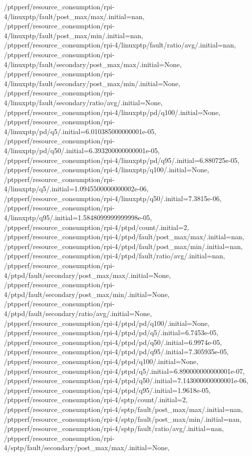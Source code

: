 {    /ptpperf/resource_consumption/rpi-4/linuxptp/fault/post_max/max/.initial=nan,
    /ptpperf/resource_consumption/rpi-4/linuxptp/fault/post_max/min/.initial=nan,
    /ptpperf/resource_consumption/rpi-4/linuxptp/fault/ratio/avg/.initial=nan,
    /ptpperf/resource_consumption/rpi-4/linuxptp/fault/secondary/post_max/max/.initial=None,
    /ptpperf/resource_consumption/rpi-4/linuxptp/fault/secondary/post_max/min/.initial=None,
    /ptpperf/resource_consumption/rpi-4/linuxptp/fault/secondary/ratio/avg/.initial=None,
    /ptpperf/resource_consumption/rpi-4/linuxptp/pd/q100/.initial=None,
    /ptpperf/resource_consumption/rpi-4/linuxptp/pd/q5/.initial=6.010385000000001e-05,
    /ptpperf/resource_consumption/rpi-4/linuxptp/pd/q50/.initial=6.393200000000001e-05,
    /ptpperf/resource_consumption/rpi-4/linuxptp/pd/q95/.initial=6.880725e-05,
    /ptpperf/resource_consumption/rpi-4/linuxptp/q100/.initial=None,
    /ptpperf/resource_consumption/rpi-4/linuxptp/q5/.initial=1.0945500000000002e-06,
    /ptpperf/resource_consumption/rpi-4/linuxptp/q50/.initial=7.3815e-06,
    /ptpperf/resource_consumption/rpi-4/linuxptp/q95/.initial=1.5848099999999998e-05,
    /ptpperf/resource_consumption/rpi-4/ptpd/count/.initial=2,
    /ptpperf/resource_consumption/rpi-4/ptpd/fault/post_max/max/.initial=nan,
    /ptpperf/resource_consumption/rpi-4/ptpd/fault/post_max/min/.initial=nan,
    /ptpperf/resource_consumption/rpi-4/ptpd/fault/ratio/avg/.initial=nan,
    /ptpperf/resource_consumption/rpi-4/ptpd/fault/secondary/post_max/max/.initial=None,
    /ptpperf/resource_consumption/rpi-4/ptpd/fault/secondary/post_max/min/.initial=None,
    /ptpperf/resource_consumption/rpi-4/ptpd/fault/secondary/ratio/avg/.initial=None,
    /ptpperf/resource_consumption/rpi-4/ptpd/pd/q100/.initial=None,
    /ptpperf/resource_consumption/rpi-4/ptpd/pd/q5/.initial=6.7453e-05,
    /ptpperf/resource_consumption/rpi-4/ptpd/pd/q50/.initial=6.9974e-05,
    /ptpperf/resource_consumption/rpi-4/ptpd/pd/q95/.initial=7.305935e-05,
    /ptpperf/resource_consumption/rpi-4/ptpd/q100/.initial=None,
    /ptpperf/resource_consumption/rpi-4/ptpd/q5/.initial=6.890000000000001e-07,
    /ptpperf/resource_consumption/rpi-4/ptpd/q50/.initial=7.143000000000001e-06,
    /ptpperf/resource_consumption/rpi-4/ptpd/q95/.initial=1.9618e-05,
    /ptpperf/resource_consumption/rpi-4/sptp/count/.initial=2,
    /ptpperf/resource_consumption/rpi-4/sptp/fault/post_max/max/.initial=nan,
    /ptpperf/resource_consumption/rpi-4/sptp/fault/post_max/min/.initial=nan,
    /ptpperf/resource_consumption/rpi-4/sptp/fault/ratio/avg/.initial=nan,
    /ptpperf/resource_consumption/rpi-4/sptp/fault/secondary/post_max/max/.initial=None,
}
